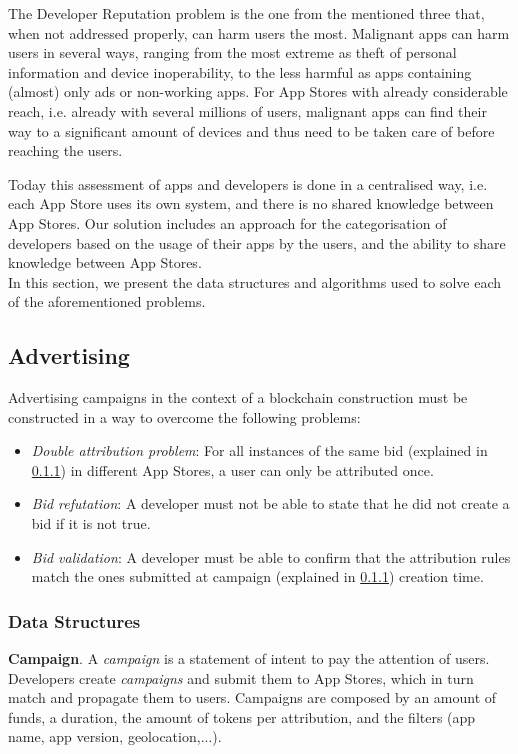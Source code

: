 The Developer Reputation problem is the one from the mentioned three that, when not addressed properly, can harm users the most. Malignant apps can harm users in several ways, ranging from the most extreme as theft of personal information and device inoperability, to the less harmful as apps containing (almost) only ads or non-working apps. For App Stores with already considerable reach, i.e. already with several millions of users, malignant apps can find their way to a significant amount of devices and thus need to be taken care of before reaching the users.

Today this assessment of apps and developers is done in a centralised way, i.e. each App Store uses its own system, and there is no shared knowledge between App Stores. Our solution includes an approach for the categorisation of developers based on the usage of their apps by the users, and the ability to share knowledge between App Stores.\\

In this section, we present the data structures and algorithms used to solve each of the aforementioned problems.

\subsection{Advertising}

Advertising campaigns in the context of a blockchain construction must be constructed in a way to overcome the following problems:
\begin{itemize}
\item \textit{Double attribution problem}: For all instances of the same bid (explained in \ref{sssec:ads_ds}) in different App Stores, a user can only be attributed once.
\item \textit{Bid refutation}: A developer must not be able to state that he did not create a bid if it is not true.
\item \textit{Bid validation}: A developer must be able to confirm that the attribution rules match the ones submitted at campaign (explained in \ref{sssec:ads_ds}) creation time.
\end{itemize}

\subsubsection{Data Structures} \label{sssec:ads_ds}

\noindent \textbf{Campaign}. A \textit{campaign} is a statement of intent to pay the attention of users. Developers create \textit{campaigns} and submit them to App Stores, which in turn match and propagate them to users. Campaigns are composed by an amount of funds, a duration, the amount of tokens per attribution, and the filters (app name, app version, geolocation,...).\\

